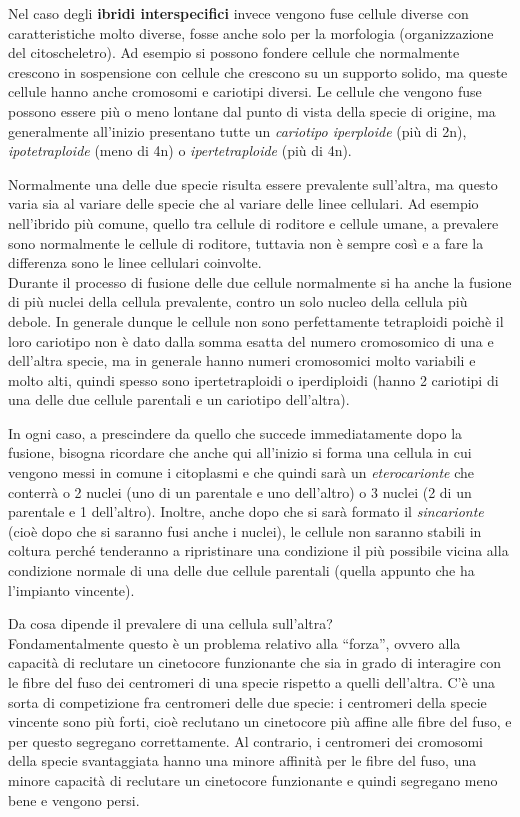\documentclass[11pt]{book}
\begin{document}
Nel caso degli \textbf{ibridi interspecifici} invece vengono fuse cellule diverse con caratteristiche molto diverse, fosse anche solo per la morfologia (organizzazione del citoscheletro). Ad esempio si possono fondere cellule che normalmente crescono in sospensione con cellule che crescono su un supporto solido, ma queste cellule hanno anche cromosomi e cariotipi diversi.
Le cellule che vengono fuse possono essere più o meno lontane dal punto di vista della specie di origine, ma generalmente all’inizio presentano tutte un \emph{cariotipo iperploide} (più di 2n), \emph{ipotetraploide} (meno di 4n) o \emph{ipertetraploide} (più di 4n).

Normalmente una delle due specie risulta essere prevalente sull’altra, ma questo varia sia al variare delle specie che al variare delle linee cellulari. Ad esempio nell’ibrido più comune, quello tra cellule di roditore e cellule umane, a prevalere sono normalmente le cellule di roditore, tuttavia non è sempre così e a fare la differenza sono le linee cellulari coinvolte.\\
Durante il processo di fusione delle due cellule normalmente si ha anche la fusione di più nuclei della cellula prevalente, contro un solo nucleo della cellula più debole. In generale dunque le cellule non sono perfettamente tetraploidi poichè il loro cariotipo non è dato dalla somma esatta del numero cromosomico di una e dell’altra specie, ma in generale hanno numeri cromosomici molto variabili e molto alti, quindi spesso sono ipertetraploidi o iperdiploidi (hanno 2 cariotipi di una delle due cellule parentali e un cariotipo dell’altra).

In ogni caso, a prescindere da quello che succede immediatamente dopo la fusione, bisogna ricordare che anche qui all’inizio si forma una cellula in cui vengono messi in comune i citoplasmi e che quindi sarà un \emph{eterocarionte} che conterrà o 2 nuclei (uno di un parentale e uno dell’altro) o 3 nuclei (2 di un parentale e 1 dell’altro). Inoltre, anche dopo che si sarà formato il \emph{sincarionte} (cioè dopo che si saranno fusi anche i nuclei), le cellule non saranno stabili in coltura perché tenderanno a ripristinare una condizione il più possibile vicina alla condizione normale di una delle due cellule parentali (quella appunto che ha l’impianto vincente).

Da cosa dipende il prevalere di una cellula sull’altra?\\ Fondamentalmente questo è un problema relativo alla ``forza'', ovvero alla capacità di reclutare un cinetocore funzionante che sia in grado di interagire con le fibre del fuso dei centromeri di una specie rispetto a quelli dell’altra. C’è una sorta di competizione fra centromeri delle due specie: i centromeri della specie vincente sono più forti, cioè reclutano un cinetocore più affine alle fibre del fuso, e per questo segregano correttamente. Al contrario, i centromeri dei cromosomi della specie svantaggiata hanno una minore affinità per le fibre del fuso, una minore capacità di reclutare un cinetocore funzionante e quindi segregano meno bene e vengono persi.
\end{document}
